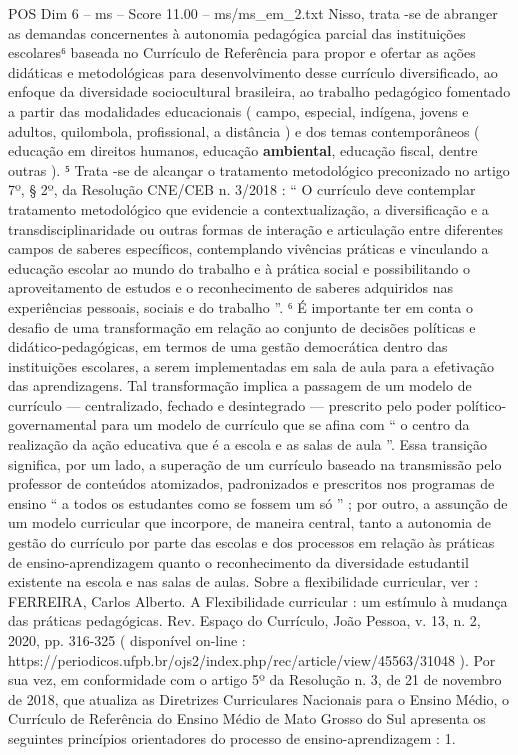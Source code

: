 \begin{textsample}{POS Dim 6 – ms – Score 11.00 – ms/ms\_em\_2.txt}
Nisso, trata -se de abranger as demandas concernentes à autonomia pedagógica parcial das instituições escolares⁶ baseada no Currículo de Referência para propor e ofertar as ações didáticas e metodológicas para desenvolvimento desse currículo diversificado, ao enfoque da diversidade sociocultural brasileira, ao trabalho pedagógico fomentado a partir das modalidades educacionais ( campo, especial, indígena, jovens e adultos, quilombola, profissional, a distância ) e dos temas contemporâneos ( educação em direitos humanos, educação \textbf{ambiental}, educação fiscal, dentre outras ). ⁵ Trata -se de alcançar o tratamento metodológico preconizado no artigo 7º, § 2º, da Resolução CNE/CEB n. 3/2018 : “ O currículo deve contemplar tratamento metodológico que evidencie a contextualização, a diversificação e a transdisciplinaridade ou outras formas de interação e articulação entre diferentes campos de saberes específicos, contemplando vivências práticas e vinculando a educação escolar ao mundo do trabalho e à prática social e possibilitando o aproveitamento de estudos e o reconhecimento de saberes adquiridos nas experiências pessoais, sociais e do trabalho ”. ⁶ É importante ter em conta o desafio de uma transformação em relação ao conjunto de decisões políticas e didático-pedagógicas, em termos de uma gestão democrática dentro das instituições escolares, a serem implementadas em sala de aula para a efetivação das aprendizagens.
Tal transformação implica a passagem de um modelo de currículo — centralizado, fechado e desintegrado — prescrito pelo poder político-governamental para um modelo de currículo que se afina com “ o centro da realização da ação educativa que é a escola e as salas de aula ”.
Essa transição significa, por um lado, a superação de um currículo baseado na transmissão pelo professor de conteúdos atomizados, padronizados e prescritos nos programas de ensino “ a todos os estudantes como se fossem um só ” ; por outro, a assunção de um modelo curricular que incorpore, de maneira central, tanto a autonomia de gestão do currículo por parte das escolas e dos processos em relação às práticas de ensino-aprendizagem quanto o reconhecimento da diversidade estudantil existente na escola e nas salas de aulas.
Sobre a flexibilidade curricular, ver : FERREIRA, Carlos Alberto.
A Flexibilidade curricular : um estímulo à mudança das práticas pedagógicas.
Rev.
Espaço do Currículo, João Pessoa, v. 13, n. 2, 2020, pp. 316-325 ( disponível on-line : https://periodicos.ufpb.br/ojs2/index.php/rec/article/view/45563/31048 ).
Por sua vez, em conformidade com o artigo 5º da Resolução n. 3, de 21 de novembro de 2018, que atualiza as Diretrizes Curriculares Nacionais para o Ensino Médio, o Currículo de Referência do Ensino Médio de Mato Grosso do Sul apresenta os seguintes princípios orientadores do processo de ensino-aprendizagem : 1.

\end{textsample}
